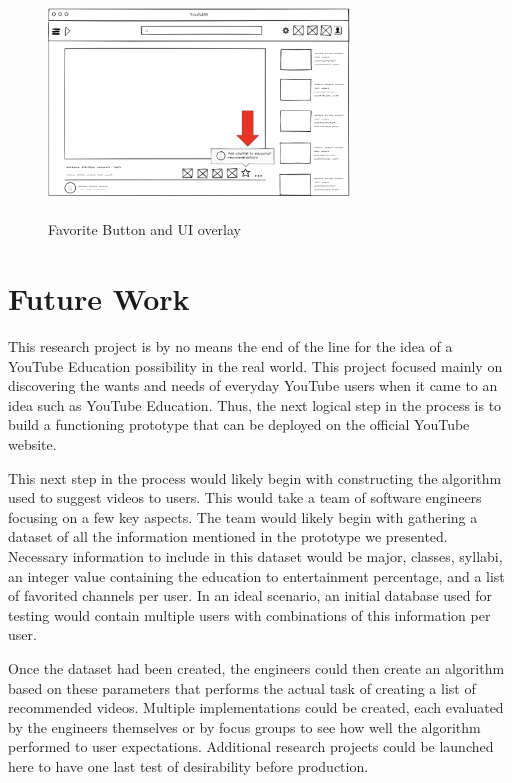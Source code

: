 \documentclass[letterpaper]{article} %
\begin{document}
\begin{figure}[h]
    \centering
    \includegraphics[width=8cm, height=6cm]{UI.png}
    \caption{Favorite Button and UI overlay}
    \label{fig:Favorite Button}
\end{figure}

\section{Future Work}
This research project is by no means the end of the line for the idea of a YouTube Education possibility in the real world. This project focused mainly on discovering the wants and needs of everyday YouTube users when it came to an idea such as YouTube Education. Thus, the next logical step in the process is to build a functioning prototype that can be deployed on the official YouTube website.


This next step in the process would likely begin with constructing the algorithm used to suggest videos to users. This would take a team of software engineers focusing on a few key aspects. The team would likely begin with gathering a dataset of all the information mentioned in the prototype we presented. Necessary information to include in this dataset would be major, classes, syllabi, an integer value containing the education to entertainment percentage, and a list of favorited channels per user. In an ideal scenario, an initial database used for testing would contain multiple users with combinations of this information per user.


Once the dataset had been created, the engineers could then create an algorithm based on these parameters that performs the actual task of creating a list of recommended videos. Multiple implementations could be created, each evaluated by the engineers themselves or by focus groups to see how well the algorithm performed to user expectations. Additional research projects could be launched here to have one last test of desirability before production.
\end{document}
